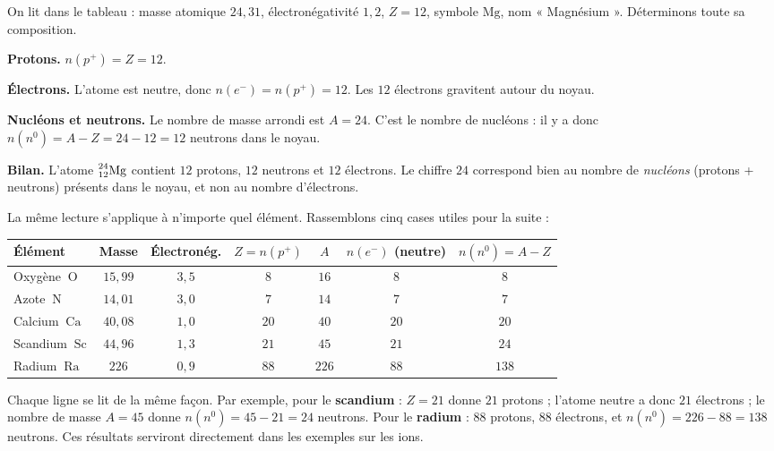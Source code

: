 \documentclass[11pt,a4paper]{article}
\newcommand{\nuc}[3]{\prescript{#1}{#2}{\mathrm{#3}}}  %
\newcommand{\pp}{p^{+}}      %
\newcommand{\ee}{e^{-}}      %
\newcommand{\nz}{n^{0}}      %
\newcommand{\np}{n(\pp)}     %
\renewcommand{\ne}{n(\ee)}   %
\newcommand{\nnn}{n(\nz)}    %
\begin{document}
\begin{exemple}
On lit dans le tableau : masse atomique $24{,}31$, électronégativité $1{,}2$, $Z = 12$, symbole
$\mathrm{Mg}$, nom « Magnésium ». Déterminons toute sa composition.

\smallskip
\textbf{Protons.} $\np = Z = 12$.

\textbf{Électrons.} L'atome est neutre, donc $\ne = \np = 12$. Les $12$ électrons gravitent autour
du noyau.

\textbf{Nucléons et neutrons.} Le nombre de masse arrondi est $A = 24$. C'est le nombre de
nucléons : il y a donc $\nnn = A - Z = 24 - 12 = 12$ neutrons dans le noyau.

\smallskip
\textbf{Bilan.} L'atome $\nuc{24}{12}{Mg}$ contient $12$ protons, $12$ neutrons et $12$ électrons.
Le chiffre $24$ correspond bien au nombre de \emph{nucléons} (protons + neutrons) présents dans le
noyau, et non au nombre d'électrons.
\end{exemple}

\begin{exemple}
La même lecture s'applique à n'importe quel élément. Rassemblons cinq cases utiles pour la suite :

\smallskip
\begin{center}
\renewcommand{\arraystretch}{1.3}
\setlength{\tabcolsep}{5pt}
\begin{tabular}{l c c c c c c}
\rowcolor{primary!18}
\textbf{Élément} & \textbf{Masse} & \textbf{Électronég.} & $Z=\np$ & $A$ & $\ne$ (neutre) & $\nnn=A-Z$ \\
\midrule
Oxygène $\ \mathrm{O}$   & $15{,}99$ & $3{,}5$ & $8$  & $16$  & $8$  & $8$  \\
\rowcolor{primary!4}
Azote $\ \mathrm{N}$     & $14{,}01$ & $3{,}0$ & $7$  & $14$  & $7$  & $7$  \\
Calcium $\ \mathrm{Ca}$  & $40{,}08$ & $1{,}0$ & $20$ & $40$  & $20$ & $20$ \\
\rowcolor{primary!4}
Scandium $\ \mathrm{Sc}$ & $44{,}96$ & $1{,}3$ & $21$ & $45$  & $21$ & $24$ \\
Radium $\ \mathrm{Ra}$   & $226$     & $0{,}9$ & $88$ & $226$ & $88$ & $138$ \\
\bottomrule
\end{tabular}
\end{center}

\smallskip
Chaque ligne se lit de la même façon. Par exemple, pour le \textbf{scandium} : $Z = 21$ donne
$21$ protons ; l'atome neutre a donc $21$ électrons ; le nombre de masse $A = 45$ donne
$\nnn = 45 - 21 = 24$ neutrons. Pour le \textbf{radium} : $88$ protons, $88$ électrons, et
$\nnn = 226 - 88 = 138$ neutrons. Ces résultats serviront directement dans les exemples sur les ions.
\end{exemple}
\end{document}
